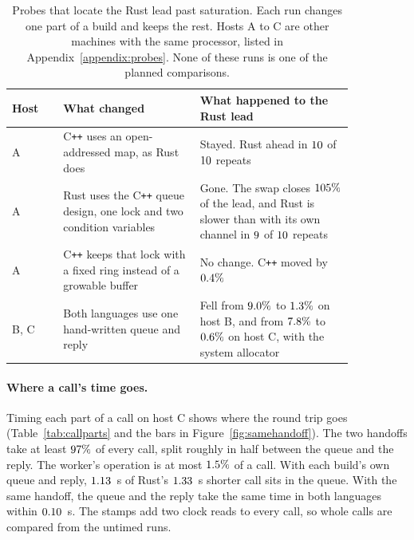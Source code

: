 \documentclass[english,oneside,a4paper,censored,csm,software-track-2020]{HYthesisML}
\begin{document}
\begin{table}[!ht]
\centering
\small
\caption[Probes that locate the lead past saturation]{Probes that locate the
Rust lead past saturation. Each run changes one part of a
build and keeps the rest. Hosts A to C are other machines with the same
processor, listed in Appendix~\ref{appendix:probes}. None of these runs is
one of the planned comparisons.\label{tab:probes}}
\renewcommand{\arraystretch}{1.2}
\setlength{\tabcolsep}{6pt}
\begin{tabular}{@{}l>{\raggedright\arraybackslash}p{0.4\linewidth}%
>{\raggedright\arraybackslash}p{0.45\linewidth}@{}}
\hline\hline
Host & What changed & What happened to the Rust lead \\
\hline
A & C\texttt{++} uses an open-addressed map, as Rust does &
Stayed. Rust ahead in $10$ of $10$ repeats \\
A & Rust uses the C\texttt{++} queue design, one lock and two condition
variables & Gone. The swap closes $105\%$ of the lead, and Rust is slower
than with its own channel in $9$ of $10$ repeats \\
A & C\texttt{++} keeps that lock with a fixed ring instead of a growable
buffer & No change. C\texttt{++} moved by $0.4\%$ \\
B, C & Both languages use one hand-written queue and reply &
Fell from $9.0\%$ to $1.3\%$ on host B,
and from $7.8\%$ to $0.6\%$ on
host C, with the system allocator \\
\hline
\end{tabular}
\end{table}

\paragraph{Where a call's time goes.}
Timing each part of a call on host C shows where the round trip goes
(Table~\ref{tab:callparts} and the bars in Figure~\ref{fig:samehandoff}). The two handoffs take at least
$97\%$ of every call, split roughly in half between the
queue and the reply. The worker's operation is at most
$1.5\%$ of a call. With each build's own queue and reply,
$1.13$~\textmu s of Rust's $1.33$~\textmu s shorter
call sits in the queue. With the same handoff, the queue and the reply take
the same time in both languages within $0.10$~\textmu s. The
stamps add two clock reads to every call, so whole calls are compared from
the untimed runs.
\end{document}

